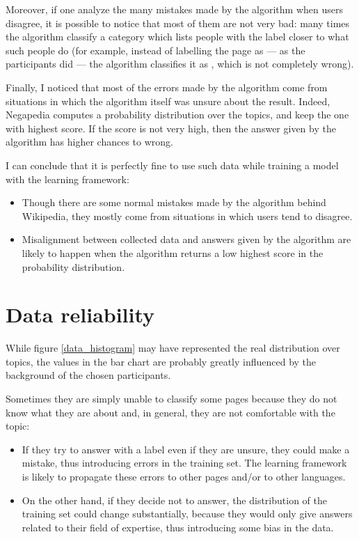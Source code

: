             Moreover, if one analyze the many mistakes made by the algorithm when users disagree, it is possible to notice that most of them are not very bad: many times the algorithm classify a category which lists people with the label closer to what such people do (for example, instead of labelling the page  as  --- as the participants did --- the algorithm classifies it as , which is not completely wrong).
            
            Finally, I noticed that most of the errors made by the algorithm come from situations in which the algorithm itself was unsure about the result. Indeed, Negapedia computes a probability distribution over the topics, and keep the one with highest score. If the score is not very high, then the answer given by the algorithm has higher chances to wrong.
            
            I can conclude that it is perfectly fine to use such data while training a model with the learning framework:
            \begin{itemize}
                \item Though there are some normal mistakes made by the algorithm behind Wikipedia, they mostly come from situations in which users tend to disagree.
                \item Misalignment between collected data and answers given by the algorithm are likely to happen when the algorithm returns a low highest score in the probability distribution.
            \end{itemize}
    \section{Data reliability}
        While figure \ref{data_histogram} may have represented the real distribution over topics, the values in the bar chart are probably greatly influenced by the background of the chosen participants.
        
        Sometimes they are simply unable to classify some pages because they do not know what they are about and, in general, they are not comfortable with the topic:
        \begin{itemize}
            \item If they try to answer with a label even if they are unsure, they could make a mistake, thus introducing errors in the training set. The learning framework is likely to propagate these errors to other pages and/or to other languages.
            \item On the other hand, if they decide not to answer, the distribution of the training set could change substantially, because they would only give answers related to their field of expertise, thus introducing some bias in the data.
        \end{itemize}
        
